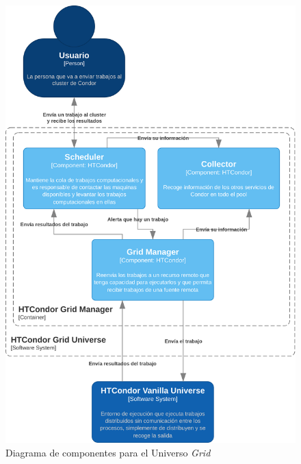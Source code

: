 \begin{figure}[H]
	\centering
	\includegraphics[scale=0.1]{tablas-images/C4/Diagramas HTCondor-Nivel 3 - Grid.drawio.png}
	\caption{Diagrama de componentes para el Universo \textit{Grid}}
    \label{fig:C4Nivel3Grid}
\end{figure}

